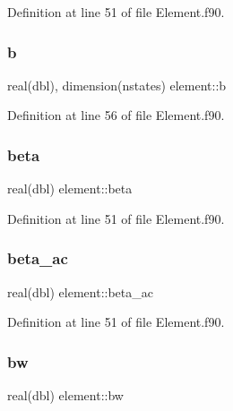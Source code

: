 Definition at line 51 of file Element.\+f90.

\mbox{\label{namespaceelement_a031bf1cdfa87524ec1b508c44f537002}} 
\subsubsection{\texorpdfstring{b}{b}}
{\footnotesize\ttfamily real(dbl), dimension(nstates) element\+::b\hspace{0.3cm}{\ttfamily [private]}}



Definition at line 56 of file Element.\+f90.

\mbox{\label{namespaceelement_a1ea3f00156313fce1a3de0a00499702c}} 
\subsubsection{\texorpdfstring{beta}{beta}}
{\footnotesize\ttfamily real(dbl) element\+::beta\hspace{0.3cm}{\ttfamily [private]}}



Definition at line 51 of file Element.\+f90.

\mbox{\label{namespaceelement_a9ab0720aafb3053cad927fc402be3000}} 
\subsubsection{\texorpdfstring{beta\+\_\+ac}{beta\_ac}}
{\footnotesize\ttfamily real(dbl) element\+::beta\+\_\+ac\hspace{0.3cm}{\ttfamily [private]}}



Definition at line 51 of file Element.\+f90.

\mbox{\label{namespaceelement_af3dda698afcf40c00ff5008dc5f3da36}} 
\subsubsection{\texorpdfstring{bw}{bw}}
{\footnotesize\ttfamily real(dbl) element\+::bw\hspace{0.3cm}{\ttfamily [private]}}



